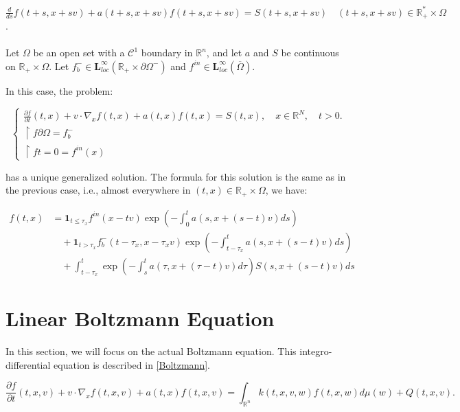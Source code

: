 \documentclass[onecolumn, 12pt, a4paper]{article}
\begin{document}
$\frac{d}{ds}f(t+s,x+sv) +a(t+s,x+sv)f(t+s,x+sv) = S(t+s,x+sv) \quad (t+s,x+sv) \in \mathbb{R}_+^* \times \Omega$.


\paragraph{}



Let $\Omega$ be an open set with a $\mathcal{C}^1$ boundary in $\mathbb{R}^n$, and let $a$ and $S$ be continuous on $\mathbb{R}_+ \times \Omega$. Let $f_b^- \in \mathbf{L}_{loc}^{\infty}(\mathbb{R}_+ \times \partial \Omega^-)$ and $f^{in} \in \mathbf{L}_{loc}^{\infty}(\overline{\Omega})$.

In this case, the problem:

\[
\begin{cases}
\frac{\partial f}{\partial t}(t,x)+v \cdot \nabla_x f(t,x)+ a(t,x)f(t,x)=S(t,x), \quad x \in \mathbb{R}^N, \quad t>0.\\
\restriction{f}{\partial \Omega}= f_b^-\\
\restriction{f}{t=0}= f^{in}(x)
\end{cases}
\]

has a unique generalized solution. The formula for this solution is the same as in the previous case, i.e., almost everywhere in $(t,x) \in \mathbb{R}_+ \times \Omega$, we have:

\[
\boxed{
\begin{aligned}
f(t,x) &= \mathbf{1}_{t \leq \tau_x} f^{in} (x-tv) \exp\left(-\int_0^t a(s,x+(s-t)v)ds\right) \\
&\quad + \mathbf{1}_{t > \tau_x} f_b^- (t-\tau_x,x-\tau_x v) \exp\left(-\int_{t-\tau_x}^t a(s,x+(s-t)v)ds\right) \\
&\quad + \int_{t-\tau_x}^t \exp\left(-\int_{s}^{t}a(\tau,x+(\tau-t)v)d\tau\right) S(s,x+(s-t)v)ds
\end{aligned}}
\]







\section{Linear Boltzmann Equation}

In this section, we will focus on the actual Boltzmann equation. This integro-differential equation is described in \ref{Boltzmann}.

\begin{equation} \label{Boltzmann}
\frac{\partial f}{\partial t}(t,x,v)+v \cdot \nabla_x f(t,x,v) + a(t,x)f(t,x,v) = \int_{\mathbb{R}^n}k(t,x,v,w)f(t,x,w)d\mu(w)+Q(t,x,v).
\end{equation}
\end{document}
